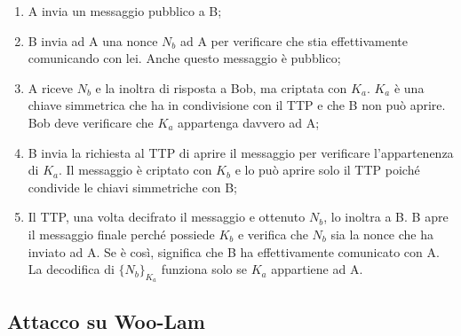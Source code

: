 \begin{enumerate}
    \item A invia un messaggio pubblico a B;
    \item B invia ad A una nonce \(N_b\) ad A per verificare che stia
          effettivamente comunicando con lei. Anche questo messaggio è
          pubblico;
    \item A riceve \(N_b\) e la inoltra di risposta a Bob, ma criptata con
          \(K_a\). \(K_a\) è una chiave simmetrica che ha in condivisione con il
          TTP e che B non può aprire. Bob deve verificare che \(K_a\)
          appartenga davvero ad A;
    \item B invia la richiesta al TTP di aprire il messaggio per verificare
          l'appartenenza di \(K_a\). Il messaggio è criptato con \(K_b\) e lo
          può aprire solo il TTP poiché condivide le chiavi simmetriche con B;
    \item Il TTP, una volta decifrato il messaggio e ottenuto \(N_b\), lo
          inoltra a B. B apre il messaggio finale perché possiede \(K_b\) e
          verifica che \(N_b\) sia la nonce che ha inviato ad A. Se è così,
          significa che B ha effettivamente comunicato con A. La decodifica di
          \(\{N_b\}_{K_a}\) funziona solo se \(K_a\) appartiene ad A.
\end{enumerate}

\subsection{Attacco su Woo-Lam}

